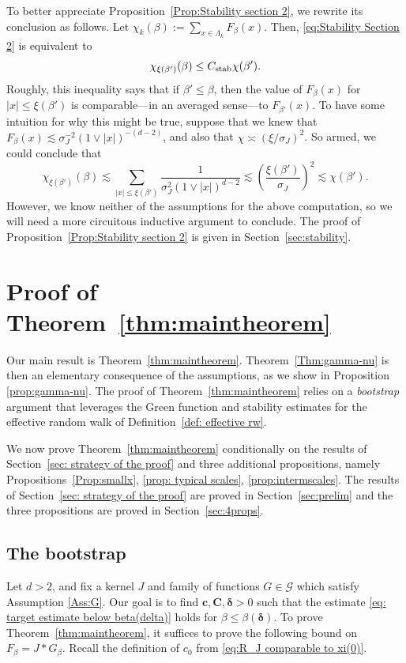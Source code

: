 \documentclass[11pt,a4paper]{article}
\numberwithin{equation}{section}
\theoremstyle{plain}
\theoremstyle{definition}
\newcommand\1{\mathds{1}}
\newcommand\bfc{\mathbf{c}}
\newcommand\bfC{\mathbf{C}}
\newcommand{\Cstab}{C_{\textup{stab}}}
\newcommand{\deltamain}{\boldsymbol{\delta}}
\begin{document}
To better appreciate Proposition~\ref{Prop:Stability section 2}, we rewrite its
conclusion as follows. Let $\chi_k(\beta):=\sum_{x\in \Lambda_k}F_\beta(x)$.  Then, \eqref{eq:Stability Section 2} is equivalent to
\begin{equation}
\label{eq:stability-chi}
	\chi_{\xi(\beta')}(\beta)\leq \Cstab \chi(\beta').
\end{equation}
Roughly, this inequality says that if
$\beta'\leq \beta$, then the value of $F_\beta(x)$ for $|x|\leq \xi(\beta')$ is comparable---in an averaged sense---to $F_{\beta'}(x)$.
To have some intuition for why this might be true,
suppose that
we knew that $F_\beta(x) \lesssim \sigma_J^{-2} (1\vee|x|)^{-(d-2)}$, and also
that $\chi \asymp (\xi/\sigma_J)^2$.  So armed, we could conclude that
\begin{equation}
    \chi_{\xi(\beta')}(\beta)
    \lesssim
    \sum_{|x| \le \xi(\beta')}\frac{1}{\sigma_J^2 (1\vee|x|)^{d-2}}
    \lesssim
    \left( \frac{\xi(\beta')}{\sigma_J}\right)^2
    \lesssim \chi(\beta').
\end{equation}
However, we know neither of the assumptions for the above computation,
so we will need a more circuitous inductive argument to conclude.
The proof of Proposition~\ref{Prop:Stability section 2} is given in Section~\ref{sec:stability}.


\section{Proof of Theorem~\ref{thm:maintheorem}}
\label{sec:proof of main theorem}



Our main result is Theorem~\ref{thm:maintheorem}. Theorem~\ref{Thm:gamma-nu} is then an elementary consequence of the assumptions, as
we show in Proposition \ref{prop:gamma-nu}.
The proof of Theorem~\ref{thm:maintheorem} relies on a \emph{bootstrap} argument that leverages the Green function and stability estimates for the effective random walk of Definition~\ref{def: effective rw}.

We now prove Theorem~\ref{thm:maintheorem} conditionally on the results of Section~\ref{sec: strategy of the proof} and three additional propositions, namely
Propositions~\ref{Prop:smallx}, \ref{prop: typical scales},  \ref{prop:intermscales}.
The results of Section~\ref{sec: strategy of the proof} are proved
in Section~\ref{sec:prelim} and the three propositions are
proved in Section~\ref{sec:4props}.

\subsection{The bootstrap}
\label{sec:pfmainthm}
Let $d>2$, and fix a kernel $J$ and family of functions
$G\in \mathcal G$ which satisfy Assumption \ref{Ass:G}. Our goal is to find $\bfc,\bfC,\deltamain>0$ such that the estimate \eqref{eq: target estimate below beta(delta)} holds for $\beta\leq\beta(\deltamain)$.
To prove Theorem~\textup{\ref{thm:maintheorem}}, it suffices to prove the following bound on $F_\beta=J*G_\beta$. Recall the definition of $c_0$ from \eqref{eq:R_J comparable to xi(0)}.
\end{document}
